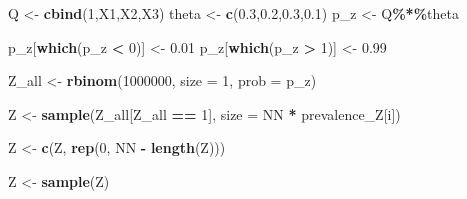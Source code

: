 \documentclass[
]{article}
\newenvironment{Shaded}{\begin{snugshade}}{\end{snugshade}}
\newcommand{\AttributeTok}[1]{\textcolor[rgb]{0.13,0.29,0.53}{#1}}
\newcommand{\DecValTok}[1]{\textcolor[rgb]{0.00,0.00,0.81}{#1}}
\newcommand{\FloatTok}[1]{\textcolor[rgb]{0.00,0.00,0.81}{#1}}
\newcommand{\FunctionTok}[1]{\textcolor[rgb]{0.13,0.29,0.53}{\textbf{#1}}}
\newcommand{\NormalTok}[1]{#1}
\newcommand{\OtherTok}[1]{\textcolor[rgb]{0.56,0.35,0.01}{#1}}
\newcommand{\SpecialCharTok}[1]{\textcolor[rgb]{0.81,0.36,0.00}{\textbf{#1}}}
\begin{document}
\begin{Shaded}
\begin{Highlighting}[]
\NormalTok{Q }\OtherTok{\textless{}{-}} \FunctionTok{cbind}\NormalTok{(}\DecValTok{1}\NormalTok{,X1,X2,X3)}
\NormalTok{    theta }\OtherTok{\textless{}{-}} \FunctionTok{c}\NormalTok{(}\FloatTok{0.3}\NormalTok{,}\FloatTok{0.2}\NormalTok{,}\FloatTok{0.3}\NormalTok{,}\FloatTok{0.1}\NormalTok{)}
\NormalTok{    p\_z }\OtherTok{\textless{}{-}}\NormalTok{ Q}\SpecialCharTok{\%*\%}\NormalTok{theta}
    
\NormalTok{    p\_z[}\FunctionTok{which}\NormalTok{(p\_z }\SpecialCharTok{\textless{}} \DecValTok{0}\NormalTok{)] }\OtherTok{\textless{}{-}} \FloatTok{0.01}
\NormalTok{    p\_z[}\FunctionTok{which}\NormalTok{(p\_z }\SpecialCharTok{\textgreater{}} \DecValTok{1}\NormalTok{)] }\OtherTok{\textless{}{-}} \FloatTok{0.99}
    
\NormalTok{    Z\_all }\OtherTok{\textless{}{-}} \FunctionTok{rbinom}\NormalTok{(}\DecValTok{1000000}\NormalTok{, }\AttributeTok{size =} \DecValTok{1}\NormalTok{, }\AttributeTok{prob =}\NormalTok{ p\_z)}
    
\NormalTok{    Z }\OtherTok{\textless{}{-}} \FunctionTok{sample}\NormalTok{(Z\_all[Z\_all }\SpecialCharTok{==} \DecValTok{1}\NormalTok{], }\AttributeTok{size =}\NormalTok{ NN }\SpecialCharTok{*}\NormalTok{ prevalence\_Z[i])}
    
\NormalTok{    Z }\OtherTok{\textless{}{-}} \FunctionTok{c}\NormalTok{(Z, }\FunctionTok{rep}\NormalTok{(}\DecValTok{0}\NormalTok{, NN }\SpecialCharTok{{-}} \FunctionTok{length}\NormalTok{(Z)))}
    
\NormalTok{    Z }\OtherTok{\textless{}{-}} \FunctionTok{sample}\NormalTok{(Z)}
\end{Highlighting}
\end{Shaded}
\end{document}
